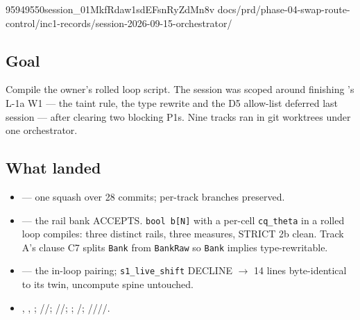 %
  {95949550}{session\_01MkfRdaw1sdEFsnRyZdMn8v}%
  {docs/prd/phase-04-swap-route-control/inc1-records/session-2026-09-15-orchestrator/}

\subsection*{Goal}
Compile the owner's rolled loop script. The session was scoped around finishing
's L-1a W1 --- the taint rule, the type rewrite and the D5 allow-list deferred
last session --- after clearing two blocking P1s. Nine tracks ran in git worktrees under
one orchestrator.

\subsection*{What landed}
\begin{itemize}
  \item {} --- one squash over 28 commits; per-track branches preserved.
  \item {} --- the rail bank ACCEPTS. \texttt{bool b[N]} with a per-cell
        \texttt{cq\_theta} in a rolled loop compiles: three distinct rails, three
        measures, STRICT 2b clean. Track A's clause C7 splits \texttt{Bank} from
        \texttt{BankRaw} so \texttt{Bank} implies type-rewritable.
  \item {} --- the in-loop pairing; \texttt{s1\_live\_shift} DECLINE
        $\rightarrow$ 14 lines byte-identical to its twin, uncompute spine untouched.
  \item {}, , ; //;
        //; ; /;
        ////.
\end{itemize}

